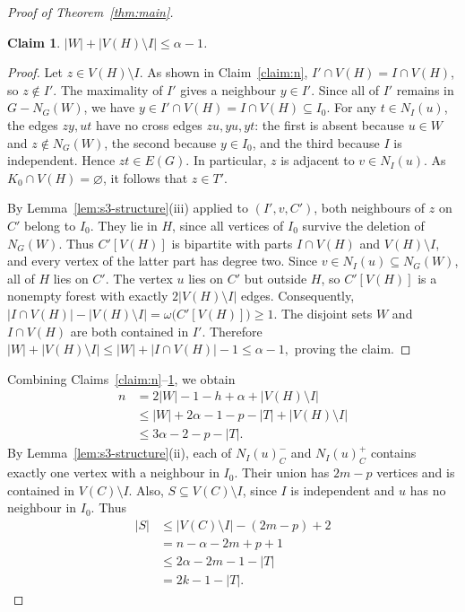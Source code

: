 \documentclass[11pt]{article}
\numberwithin{equation}{section}
\theoremstyle{plain}
\theoremstyle{definition}
\theoremstyle{plain}
\newtheorem{claim}{Claim}[section]
\begin{document}
\begin{proof}[Proof of Theorem~\ref{thm:main}]
\begin{claim}\label{claim:|W|+|V(H)setminus I|}
    $|W|+|V(H)\setminus I|\leq\alpha-1$.
\end{claim}

\begin{proof}
Let $z\in V(H)\setminus I$.
As shown in Claim~\ref{claim:n},
$I'\cap V(H)=I\cap V(H)$, so $z\notin I'$.
The maximality of $I'$ gives a neighbour $y\in I'$.
Since all of $I'$ remains in $G-N_G(W)$, we have
$y\in I'\cap V(H)=I\cap V(H)\subseteq I_0$.
For any $t\in N_I(u)$, the edges $zy,ut$ have no cross edges
$zu,yu,yt$: the first is absent because $u\in W$ and
$z\notin N_G(W)$, the second because $y\in I_0$, and the third
because $I$ is independent.
Hence $zt\in E(G)$.
In particular, $z$ is adjacent to $v\in N_I(u)$.
As $K_0\cap V(H)=\varnothing$, it follows that $z\in T'$.

By Lemma~\ref{lem:s3-structure}\textup{(iii)} applied to
$(I',v,C')$, both neighbours of $z$ on $C'$ belong to $I_0$.
They    lie in $H$, since all vertices of $I_0$ survive the deletion
of $N_G(W)$.
Thus $C'[V(H)]$ is bipartite with parts $I\cap V(H)$ and
$V(H)\setminus I$, and every vertex of the latter part has degree two.
Since $v\in N_I(u)\subseteq N_G(W)$, all of $H$ lies on $C'$.
The vertex $u$ lies on $C'$ but outside $H$, so $C'[V(H)]$ is a
nonempty forest with exactly $2|V(H)\setminus I|$ edges.
Consequently,
 $|I\cap V(H)|-|V(H)\setminus I|
 =\omega\bigl(C'[V(H)]\bigr)\geq1$.
The disjoint sets $W$ and $I\cap V(H)$ are both contained in $I'$.
Therefore
$ |W|+|V(H)\setminus I|
 \leq |W|+|I\cap V(H)|-1
 \leq\alpha-1,$
proving the claim.
\end{proof}

\medskip
Combining Claims~\ref{claim:n}--\ref{claim:|W|+|V(H)setminus I|},
we obtain
\[
\begin{aligned}
 n
 &=2|W|-1-h+\alpha+|V(H)\setminus I|\\
 &\leq |W|+2\alpha-1-p-|T|+|V(H)\setminus I|\\
 &\leq 3\alpha-2-p-|T|.
\end{aligned}
\]
By Lemma~\ref{lem:s3-structure}\textup{(ii)}, each of
$N_I(u)_C^-$ and $N_I(u)_C^+$ contains exactly one vertex with
a neighbour in $I_0$.
Their union has $2m-p$ vertices and is contained in
$V(C)\setminus I$.
Also, $S\subseteq V(C)\setminus I$, since $I$ is independent and
$u$ has no neighbour in $I_0$.
Thus
\[
\begin{aligned}
 |S|
 &\leq |V(C)\setminus I|-(2m-p)+2\\
 &=n-\alpha-2m+p+1\\
 &\leq 2\alpha-2m-1-|T|\\
 &=2k-1-|T|.
\end{aligned}
\]


\end{proof}
\end{document}
